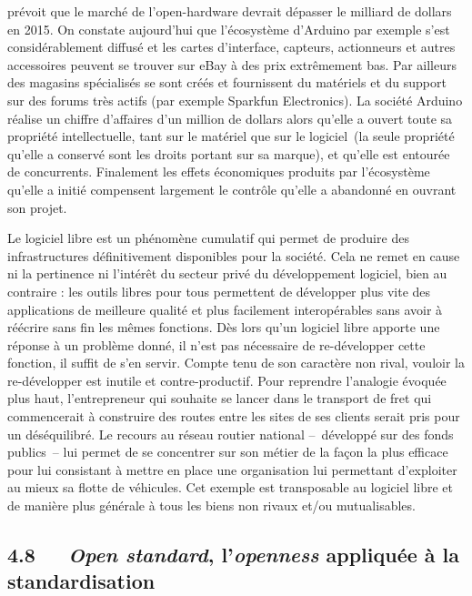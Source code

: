 \documentclass{FramateX}
\begin{document}
\begin{refsection}
prévoit que le marché de l'open-hardware devrait
dépasser le milliard de dollars en 2015. On constate aujourd'hui que
l'écosystème d'Arduino par exemple s'est considérablement diffusé et
les cartes d'interface, capteurs, actionneurs et autres accessoires
peuvent se trouver sur eBay à des prix extrêmement bas. Par ailleurs
des magasins spécialisés se sont créés et fournissent du matériels et
du support sur des forums très actifs (par exemple Sparkfun
Electronics). La société Arduino réalise un chiffre d'affaires d'un
million de dollars alors qu'elle a ouvert toute sa propriété
intellectuelle, tant sur le matériel que sur le logiciel~(la seule
propriété qu'elle a conservé sont les droits portant sur sa marque), et
qu'elle est entourée de concurrents. Finalement les effets économiques
produits par l'écosystème qu'elle a initié compensent largement le
contrôle qu'elle a abandonné en ouvrant son projet.

Le logiciel libre est un phénomène cumulatif qui permet de produire des
infrastructures définitivement disponibles pour la société. Cela ne
remet en cause ni la pertinence ni l'intérêt du secteur privé du
développement logiciel, bien au contraire : les outils libres pour tous
permettent de développer plus vite des applications de meilleure
qualité et plus facilement interopérables sans avoir à réécrire sans
fin les mêmes fonctions. Dès lors qu'un logiciel libre apporte une
réponse à un problème donné, il n'est pas nécessaire de re-développer
cette fonction, il suffit de s'en servir. Compte tenu de son caractère
non rival, vouloir la re-développer est inutile et contre-productif.
Pour reprendre l'analogie évoquée plus haut, l'entrepreneur qui
souhaite se lancer dans le transport de fret qui commencerait à
construire des routes entre les sites de ses clients serait pris pour
un déséquilibré. Le recours au réseau routier national --~développé sur
des fonds publics~-- lui permet de se concentrer sur son métier de la
façon la plus efficace pour lui consistant à mettre en place une
organisation lui permettant d'exploiter au mieux sa flotte de
véhicules. Cet exemple est transposable au logiciel libre et de manière
plus générale à tous les biens non rivaux et/ou mutualisables.

\subsection*{4.8~~~\textit{Open standard}, l'\textit{openness} appliquée à la standardisation}
{}


\end{refsection}
\end{document}
